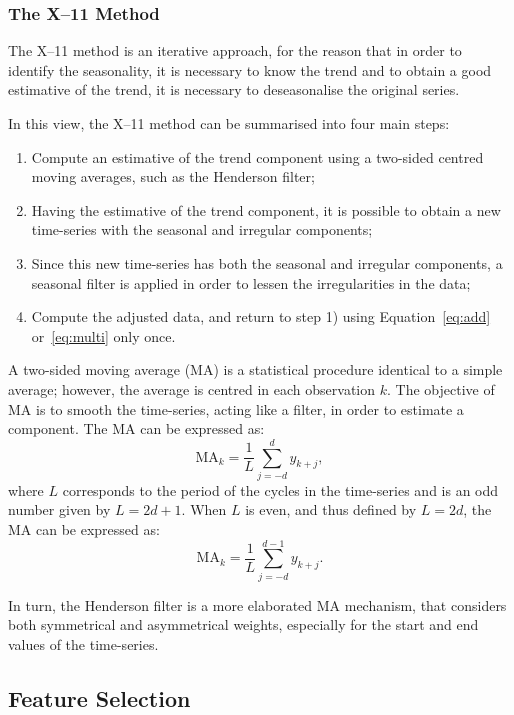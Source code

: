 \subsubsection{The X--11 Method}

The X--11 method is an iterative approach, for the reason that in order to identify the seasonality, it is necessary to know the trend and to obtain a good estimative of the trend, it is necessary to deseasonalise the original series.

In this view, the X--11 method can be summarised into four main steps:
\begin{enumerate}
    \item Compute an estimative of the trend component using a two-sided centred moving averages, such as the Henderson filter; 
    \item Having the estimative of the trend component, it is possible to obtain a new time-series with the seasonal and irregular components;
    \item Since this new time-series has both the seasonal and irregular components, a seasonal filter is applied in order to lessen the irregularities in the data;
    \item Compute the adjusted data, and return to step 1) using Equation~\eqref{eq:add} or~\eqref{eq:multi} only once.
\end{enumerate}

A two-sided moving average (MA) is a statistical procedure identical to a simple average; however, the average is centred in each observation $k$. The objective of MA is to smooth the time-series, acting like a filter, in order to estimate a component. The MA can be expressed as:
\begin{equation}
    \text{MA}_k = \dfrac{1}{L}\sum^{d}_{j=-d} y_{k+j},
\end{equation}
where $L$ corresponds to the period of the cycles in the time-series and is an odd number given by $L=2d+1$. When $L$ is even, and thus defined by $L=2d$, the MA can be expressed as:
\begin{equation}
    \text{MA}_k = \dfrac{1}{L}\sum^{d-1}_{j=-d} y_{k+j}.
\end{equation}

In turn, the Henderson filter is a more elaborated MA mechanism, that considers both symmetrical and asymmetrical weights, especially for the start and end values of the time-series.

\subsection{Feature Selection}

